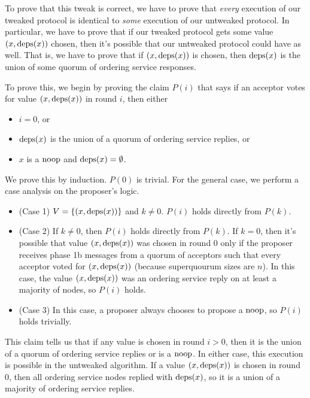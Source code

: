 \documentclass{mwhittaker}
\begin{document}
To prove that this tweak is correct, we have to prove that \emph{every}
execution of our tweaked protocol is identical to \emph{some} execution of our
untweaked protocol. In particular, we have to prove that if our tweaked
protocol gets some value $(x, \text{deps}(x))$ chosen, then it's possible that our
untweaked protocol could have as well. That is, we have to prove that if $(x,
\text{deps}(x))$ is chosen, then $\text{deps}(x)$ is the union of some quorum of ordering
service responses.

To prove this, we begin by proving the claim $P(i)$ that says if an acceptor
votes for value $(x, \text{deps}(x))$ in round $i$, then either
\begin{itemize}
  \item $i = 0$, or
  \item $\text{deps}(x)$ is the union of a quorum of ordering service replies, or
  \item $x$ is a $\text{noop}$ and $\text{deps}(x) = \emptyset{}$.
\end{itemize}
We prove this by induction. $P(0)$ is trivial. For the general case, we perform
a case analysis on the proposer's logic.
\begin{itemize}
  \item (Case 1)
    $V = \{(x, \text{deps}(x))\}$ and $k \neq 0$. $P(i)$ holds directly from
    $P(k)$.

  \item (Case 2)
    If $k \neq 0$, then $P(i)$ holds directly from $P(k)$. If $k = 0$, then
    it's possible that value $(x, \text{deps}(x))$ was chosen in round $0$ only if
    the proposer receives phase 1b messages from a quorum of acceptors such
    that every acceptor voted for $(x, \text{deps}(x))$ (because superquourum sizes
    are $n$). In this case, the value $(x, \text{deps}(x))$ was an ordering service
    reply on at least a majority of nodes, so $P(i)$ holds.

  \item (Case 3)
    In this case, a proposer always chooses to propose a $\text{noop}$, so $P(i)$
    holds trivially.
\end{itemize}

This claim tells us that if any value is chosen in round $i > 0$, then it is
the union of a quorum of ordering service replies or is a $\text{noop}$. In either
case, this execution is possible in the untweaked algorithm. If a value $(x,
\text{deps}(x))$ is chosen in round $0$, then all ordering service nodes replied with
$\text{deps}(x)$, so it is a union of a majority of ordering service replies.
\end{document}
